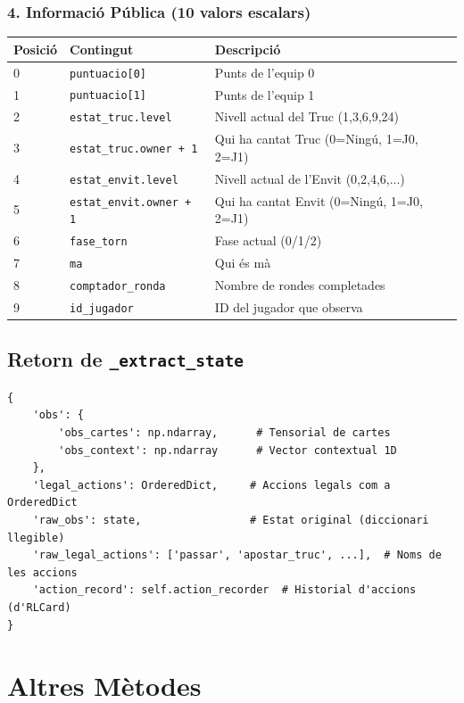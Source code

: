 \documentclass[a4paper,11pt]{report}
\begin{document}
\subsubsection{4. Informació Pública (10 valors escalars)}

\begin{longtable}{|l|l|p{8cm}|}
\hline
\textbf{Posició} & \textbf{Contingut} & \textbf{Descripció} \\
\hline
0 & \texttt{puntuacio[0]} & Punts de l'equip 0 \\
1 & \texttt{puntuacio[1]} & Punts de l'equip 1 \\
2 & \texttt{estat\_truc.level} & Nivell actual del Truc (1,3,6,9,24) \\
3 & \texttt{estat\_truc.owner + 1} & Qui ha cantat Truc (0=Ningú, 1=J0, 2=J1) \\
4 & \texttt{estat\_envit.level} & Nivell actual de l'Envit (0,2,4,6,...) \\
5 & \texttt{estat\_envit.owner + 1} & Qui ha cantat Envit (0=Ningú, 1=J0, 2=J1) \\
6 & \texttt{fase\_torn} & Fase actual (0/1/2) \\
7 & \texttt{ma} & Qui és mà \\
8 & \texttt{comptador\_ronda} & Nombre de rondes completades \\
9 & \texttt{id\_jugador} & ID del jugador que observa \\
\hline
\end{longtable}

\subsection{Retorn de \texttt{\_extract\_state}}

\begin{lstlisting}
{
    'obs': {
        'obs_cartes': np.ndarray,      # Tensorial de cartes
        'obs_context': np.ndarray      # Vector contextual 1D
    },
    'legal_actions': OrderedDict,     # Accions legals com a OrderedDict
    'raw_obs': state,                 # Estat original (diccionari llegible)
    'raw_legal_actions': ['passar', 'apostar_truc', ...],  # Noms de les accions
    'action_record': self.action_recorder  # Historial d'accions (d'RLCard)
}
\end{lstlisting}

\hrulefill

\section{Altres Mètodes}
\end{document}
